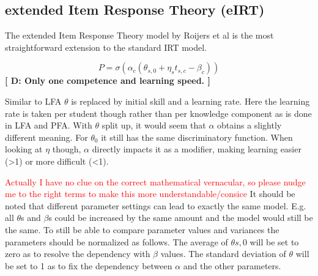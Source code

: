 \documentclass{scrartcl}
\newcommand\todo[1]{\textcolor{red}{#1}}
\providecommand{\comm}[1]{{\bf[ #1 ]}}
\providecommand{\commd}[1]{\comm{D: {#1}}}
\begin{document}
\begin{comment}
To compare the PFA parameter values to LFA values, the weighted average (according to the ratio g:f for each problem) of $\gamma$ and $\rho$ should be compared to $\eta$. $\theta$ cannot be compared when comparing PFA on LFA data, vice versa, $\theta$ should be compared to 0. In case of PFA+ $\theta$ values can be compared directly.

\begin{mycapequ}
\begin{equation}
\eta_{c}: \frac{\gamma_{c} g_{c} + \rho_{c} f_{c}}{g_{c}+f_{c}}
\end{equation}
\caption{Comparison of LFA parameters to PFA parameters}
\end{mycapequ}
\end{comment}

\subsection{extended Item Response Theory (eIRT)}
\label{sec:eirt}
The extended Item Response Theory model by Roijers et al \cite{eirt} is the most straightforward extension to the standard IRT model.

\begin{equation}
\label{eq:eirt}
P = \sigma(\alpha_{c} (\theta_{s,0} + \eta_{s} t_{s,c} - \beta_{c}))
\end{equation}
\commd{Only one competence and learning speed.}

Similar to LFA $\theta$ is replaced by initial skill and a learning rate. Here the learning rate is taken per student though rather than per knowledge component as is done in LFA and PFA. With $\theta$ split up, it would seem that $\alpha$ obtains a slightly different meaning. For $\theta_{0}$ it still has the same discriminatory function. When looking at $\eta$ though, $\alpha$ directly impacts it as a modifier, making learning easier (>1) or more difficult (<1).

\todo{Actually I have no clue on the correct mathematical vernacular, so please nudge me to the right terms to make this more understandable/consice}
It should be noted that different parameter settings can lead to exactly the same model. E.g. all $\theta$s and $\beta$s could be increased by the same amount and the model would still be the same. To still be able to compare parameter values and variances the parameters should be normalized as follows. The average of $\theta{s,0}$ will be set to zero as to resolve the dependency with $\beta$ values. The standard deviation of $\theta$ will be set to 1 as to fix the dependency between $\alpha$ and the other parameters.
\end{document}
